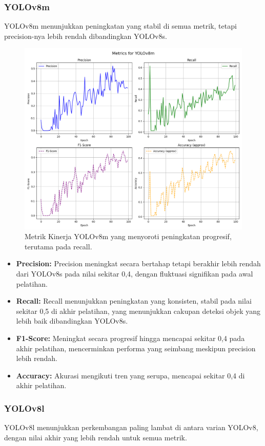 \documentclass[12pt,a4paper]{article}
\begin{document}
\subsubsection{YOLOv8m}
YOLOv8m menunjukkan peningkatan yang stabil di semua metrik, tetapi precision-nya lebih rendah dibandingkan YOLOv8s.  

\begin{figure}[H]
    \centering
    \includegraphics[width=0.6\linewidth]{assets/yolov8m_metrics.png}
    \caption{Metrik Kinerja YOLOv8m yang menyoroti peningkatan progresif, terutama pada recall.}
    \label{fig:yolov8m}
\end{figure}

\begin{itemize}
    \item \textbf{Precision:} Precision meningkat secara bertahap tetapi berakhir lebih rendah dari YOLOv8s pada nilai sekitar 0,4, dengan fluktuasi signifikan pada awal pelatihan.
    \item \textbf{Recall:} Recall menunjukkan peningkatan yang konsisten, stabil pada nilai sekitar 0,5 di akhir pelatihan, yang menunjukkan cakupan deteksi objek yang lebih baik dibandingkan YOLOv8s.
    \item \textbf{F1-Score:} Meningkat secara progresif hingga mencapai sekitar 0,4 pada akhir pelatihan, mencerminkan performa yang seimbang meskipun precision lebih rendah.
    \item \textbf{Accuracy:} Akurasi mengikuti tren yang serupa, mencapai sekitar 0,4 di akhir pelatihan.
\end{itemize}

\subsubsection{YOLOv8l}
YOLOv8l menunjukkan perkembangan paling lambat di antara varian YOLOv8, dengan nilai akhir yang lebih rendah untuk semua metrik. 
\end{document}
